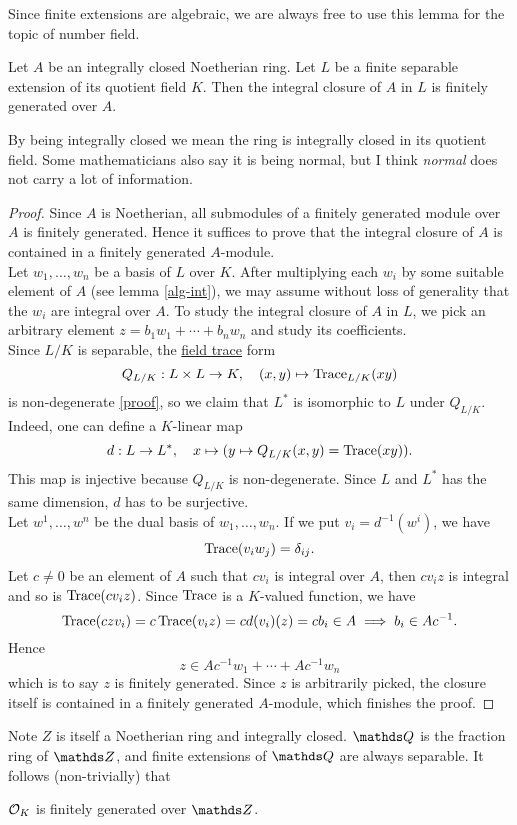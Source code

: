 			Since finite extensions are algebraic, we are always free to use this lemma for the topic of number field.
			
			\begin{theorem}\label{closure-f-g}
				Let $A$ be an integrally closed Noetherian ring. Let $L$ be a finite separable extension of its quotient field $K$. Then the integral closure of $A$ in $L$ is finitely generated over $A$.
			\end{theorem}
		
			By being integrally closed we mean the ring is integrally closed in its quotient field. Some mathematicians also say it is being normal, but I think \textit{normal} does not carry a lot of information.
			
			\begin{proof}
				Since $A$ is Noetherian, all submodules of a finitely generated module over $A$ is finitely generated. Hence it suffices to prove that the integral closure of $A$ is contained in a finitely generated $A$-module.\\
				Let $w_1,\dots,w_n$ be a basis of $L$ over $K$. After multiplying each $w_i$ by some suitable element of $A$ (see lemma \ref{alg-int}), we may assume without loss of generality that the $w_i$ are integral over $A$. To study the integral closure of $A$ in $L$, we pick an arbitrary element $z = b_1w_1+\cdots+b_nw_n$ and study its coefficients. \\
				Since $L/K$ is separable, the \href{https://stacks.math.columbia.edu/tag/0BIF}{field trace} form
				\[
					Q_{L/K}:L \times L \to K, \quad (x,y) \mapsto \operatorname{Trace}_{L/K}(xy)
				\]
				is non-degenerate  \href{https://stacks.math.columbia.edu/tag/0BIL}{[proof]}, so we claim that $L^\ast$ is isomorphic to $L$ under $Q_{L/K}$. Indeed, one can define a $K$-linear map
				\[
					d:L \to L^\ast, \quad x \mapsto (y \mapsto Q_{L/K}(x,y)=\operatorname{Trace}(xy)).
				\]
				This map is injective because $Q_{L/K}$ is non-degenerate. Since $L$ and $L^\ast$ has the same dimension, $d$ has to be surjective.\\
				Let $w^1,\dots,w^n$ be the dual basis of $w_1,\dots,w_n$. If we put $v_i=d^{-1}(w^i)$, we have
				\[
					\operatorname{Trace}(v_i w_j) = \delta_{ij}.
				\]
				Let $c \ne 0$ be an element of $A$ such that $cv_i$ is integral over $A$, then $cv_iz$ is integral and so is $\operatorname{Trace}(cv_iz)$. Since $\operatorname{Trace}$ is a $K$-valued function, we have
				\[
					\operatorname{Trace}(czv_i)=c\operatorname{Trace}(v_iz)=c d(v_i)(z) = cb_i \in A \implies b_i \in Ac^{-1}.
				\]
				Hence
				\[
					z \in Ac^{-1}w_1+\cdots+Ac^{-1}w_n
				\]
				which is to say $z$ is finitely generated. Since $z$ is arbitrarily picked, the closure itself is contained in a finitely generated $A$-module, which finishes the proof. 
			\end{proof}
			Note $Z$ is itself a Noetherian ring and integrally closed. $\Q$ is the fraction ring of $\Z$, and finite extensions of $\Q$ are always separable. It follows (non-trivially) that
			\begin{corollary}
				$\mathcal{O}_K$ is finitely generated over $\Z$.
			\end{corollary}
			
